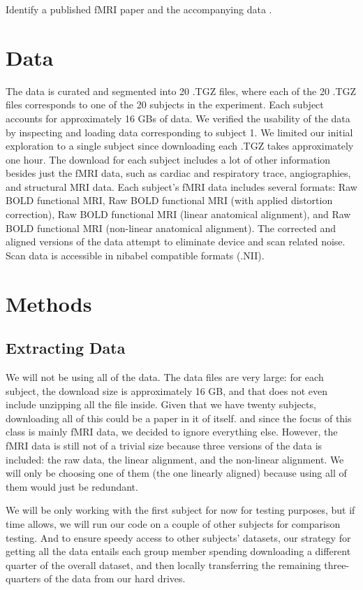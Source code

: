 \documentclass[11pt]{article}
\begin{document}
Identify a published fMRI paper and the accompanying data
\cite{hank2014audiomovie}.

\section{Data}

The data is curated and segmented into 20 .TGZ files, where each of the 20
.TGZ files corresponds to one of the 20 subjects in the experiment. Each
subject accounts for approximately 16 GBs of data. We verified the usability
of the data by inspecting and loading data corresponding to subject 1. We
limited our initial exploration to a single subject since downloading each
.TGZ takes approximately one hour.  The download for each subject includes a
lot of other information besides just the fMRI data, such as cardiac and
respiratory trace, angiographies, and structural MRI data. Each subject's fMRI
data includes several formats: Raw BOLD functional MRI, Raw BOLD functional
MRI (with applied distortion correction), Raw BOLD functional MRI (linear
anatomical alignment), and Raw BOLD functional MRI (non-linear anatomical
alignment). The corrected and aligned versions of the data attempt to
eliminate device and scan related noise. Scan data is accessible in nibabel
compatible formats (.NII).

\section{Methods}

\subsection{Extracting Data}

We will not be using all of the data. The data
files are very large: for each subject, the download size is approximately 16
GB, and that does not even include unzipping all the file inside. Given that
we have twenty subjects, downloading all of this could be a paper in it of
itself. and since the focus of this class is mainly fMRI data, we decided to
ignore everything else. However, the fMRI data is still not of a trivial size
because three versions of the data is included: the raw data, the linear
alignment, and the non-linear alignment. We will only be choosing one of them
(the one linearly aligned) because using all of them would just be redundant.

We will be only working with the first subject for now for testing purposes,
but if time allows, we will run our code on a couple of other subjects for
comparison testing. And to ensure speedy access to other subjects' datasets,
our strategy for getting all the data entails each group member spending
downloading a different quarter of the overall dataset, and then locally
transferring the remaining three-quarters of the data from our hard drives.
\end{document}
